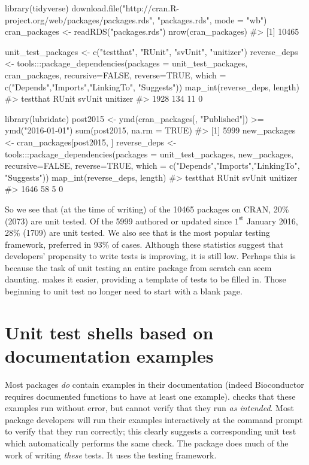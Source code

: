 \begin{example}
library(tidyverse)
download.file("http://cran.R-project.org/web/packages/packages.rds",
              "packages.rds", mode = "wb")
cran_packages <- readRDS("packages.rds")
nrow(cran_packages)
#> [1] 10465

unit_test_packages <- c("testthat", "RUnit", "svUnit", "unitizer")
reverse_deps <- tools:::package_dependencies(packages = unit_test_packages,
                  cran_packages, recursive=FALSE, reverse=TRUE,
                  which = c("Depends","Imports","LinkingTo", "Suggests"))
map_int(reverse_deps, length)
#> testthat    RUnit   svUnit unitizer 
#>     1928      134       11        0


library(lubridate)
post2015 <- ymd(cran_packages[, "Published"]) >= ymd("2016-01-01")
sum(post2015, na.rm = TRUE)
#> [1] 5999
new_packages <- cran_packages[post2015, ]
reverse_deps <- tools:::package_dependencies(packages = unit_test_packages,
                  new_packages, recursive=FALSE, reverse=TRUE,
                  which = c("Depends","Imports","LinkingTo", "Suggests"))
map_int(reverse_deps, length)
#> testthat    RUnit   svUnit unitizer 
#>     1646       58        5        0
\end{example}
So we see that (at the time of writing) of the 10465 packages on CRAN, 20\% (2073) are unit tested. Of the 5999 authored or updated since $1^\text{st}$ January 2016, 28\% (1709) are unit tested. We also see that  is the most popular testing framework, preferred in 93\% of cases.
Although these statistics suggest that developers' propensity to write tests is improving, it is still low. Perhaps this is because the task of unit testing an entire package from scratch can seem daunting. 
 makes it easier, providing a template of tests to be filled in. Those beginning to unit test no longer need to start with a blank page.%

\section{Unit test shells based on documentation examples}
Most packages \emph{do} contain examples in their documentation (indeed Bioconductor \citep{bioc} requires documented functions to have at least one example).  checks that these examples run without error, but cannot verify that they run \emph{as intended}. Most package developers will run their examples interactively at the command prompt to verify that they run correctly; this clearly suggests a corresponding unit test which automatically performs the same check. The  package \citep{exampletestr} does much of the work of writing \emph{these} tests. It uses the  testing framework.

